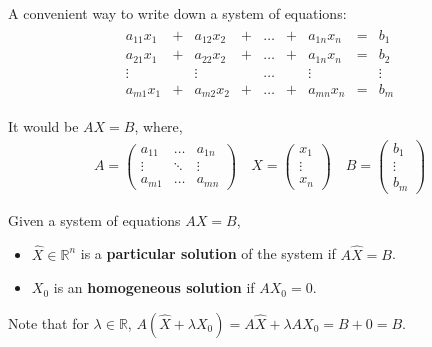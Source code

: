 \documentclass[aspectratio=169]{beamer}
\begin{document}
\begin{frame}
    A convenient way to write down a system of equations:
    \begin{align*}
        \begin{array}{ccccccccc}
        a_{11} x_1 &+& a_{12} x_2 &+&\ldots &+& a_{1n}x_n  &=& b_1\\
        a_{21} x_1 &+& a_{22} x_2 &+&\ldots &+& a_{1n}x_n  &=& b_2\\
        \vdots & &  \vdots & &\ldots & & \vdots  & & \vdots\\
        a_{m1} x_1 &+& a_{m2} x_2 &+&\ldots &+& a_{mn}x_n  &=& b_m
        \end{array}
    \end{align*}
    
    It would be $A X = B$, where,
    \begin{align*}
        A=\left(\begin{array}{ccc}a_{11}&\ldots&a_{1n}\\ \vdots & \ddots & \vdots \\ a_{m1}&\ldots&a_{mn}\end{array}\right)\quad X=\left(\begin{array}{c}x_1\\ \vdots \\ x_n\end{array}\right) \quad
        B = \left(\begin{array}{c}
             b_1\\\vdots \\ b_m
        \end{array}\right)
    \end{align*}
\end{frame}

\begin{frame}
\begin{definition}
    Given a system of equations $AX=B$, \begin{itemize}
        \item $\hat{X}\in\mathds{R}^n$ is a \textbf{particular solution} of the system if $A\hat{X}=B$.
        \item $X_0$ is an \textbf{homogeneous solution} if $AX_0=0$.
    \end{itemize}
    
    
\end{definition}
    
    Note that for $\lambda\in\mathds{R}$, $A(\hat{X}+\lambda X_0)=A\hat{X}+\lambda A X_0 = B+0 = B$.
    
    \vspace{0.5cm}
    
\end{frame}
\end{document}
